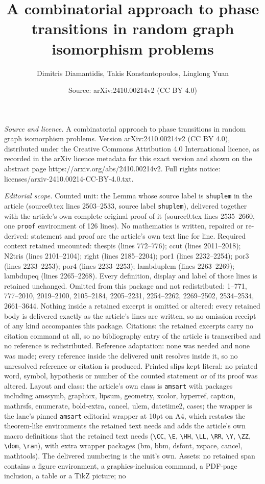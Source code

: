\documentclass[10pt,a4paper]{amsart}
\title[A combinatorial approach to phase transitions in random grap]{A combinatorial approach to phase transitions in random graph isomorphism problems}
\author{Dimitris Diamantidis, Takis Konstantopoulos, Linglong Yuan}
\date{Source: arXiv:2410.00214v2 (CC BY 4.0)}
\begin{document}
\maketitle

\noindent\emph{Source and licence.} A combinatorial approach to phase transitions in random graph isomorphism problems. Version arXiv:2410.00214v2 (CC BY 4.0), distributed under the Creative Commons Attribution 4.0 International licence, as recorded in the arXiv licence metadata for this exact version and shown on the abstract page https://arxiv.org/abs/2410.00214v2. Full rights notice: licenses/arxiv-2410.00214-CC-BY-4.0.txt.\par\smallskip

\noindent\textit{Editorial scope.} Counted unit: the Lemma whose source label is \texttt{shuplem} in the article (source0.tex lines 2503--2533, source label \texttt{shuplem}), delivered together with the article's own complete original proof of it (source0.tex lines 2535--2660, one \texttt{proof} environment of 126 lines). No mathematics is written, repaired or re-derived: statement and proof are the article's own text line for line. Required context retained uncounted: thespis (lines 772--776); ccut (lines 2011--2018); N2tris (lines 2101--2104); right (lines 2185--2204); por1 (lines 2232--2254); por3 (lines 2233--2253); por4 (lines 2233--2253); lambduplem (lines 2263--2269); lambdupeq (lines 2265--2268). Every definition, display and label of those lines is retained unchanged. Omitted from this package and not redistributed: 1--771, 777--2010, 2019--2100, 2105--2184, 2205--2231, 2254--2262, 2269--2502, 2534--2534, 2661--3644. Nothing inside a retained excerpt is omitted or altered: every retained body is delivered exactly as the article's lines are written, so no omission receipt of any kind accompanies this package. Citations: the retained excerpts carry no citation command at all, so no bibliography entry of the article is transcribed and no reference is redistributed. Reference adaptation: none was needed and none was made; every reference inside the delivered unit resolves inside it, so no unresolved reference or citation is produced. Printed slips kept literal: no printed word, symbol, hypothesis or number of the counted statement or of its proof was altered. Layout and class: the article's own class is \texttt{amsart} with packages including amssymb, graphicx, lipsum, geometry, xcolor, hyperref, caption, mathrsfs, enumerate, bold-extra, cancel, ulem, datetime2, cases; the wrapper is the lane's pinned \texttt{amsart} editorial wrapper at 10pt on A4, which restates the theorem-like environments the retained text needs and adds the article's own macro definitions that the retained text needs (\texttt{\textbackslash CC}, \texttt{\textbackslash E}, \texttt{\textbackslash HH}, \texttt{\textbackslash LL}, \texttt{\textbackslash RR}, \texttt{\textbackslash Y}, \texttt{\textbackslash ZZ}, \texttt{\textbackslash dom}, \texttt{\textbackslash ran}), with extra wrapper packages (bm, bbm, dsfont, xspace, cancel, mathtools). The delivered numbering is the unit's own. Assets: no retained span contains a figure environment, a graphics-inclusion command, a PDF-page inclusion, a table or a TikZ picture; no 
\end{document}
